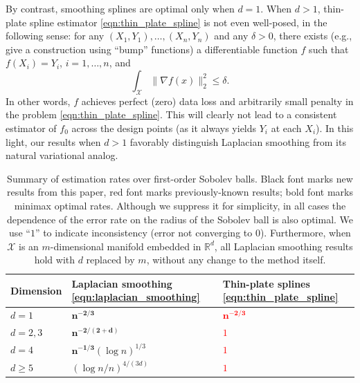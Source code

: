 \documentclass[twoside]{article}
\newcommand{\Reals}{\mathbb{R}}
\newcommand{\1}{\mathbf{1}}
\newcommand{\Rd}{\Reals^d}
\newcommand{\Xset}{\mathcal{X}}
\theoremstyle{definition}
\theoremstyle{remark}
\begin{document}
By contrast, smoothing splines are optimal only when $d=1$. When $d>1$, thin-plate spline estimator \eqref{eqn:thin_plate_spline} is not even well-posed, in the following sense: for any $(X_1,Y_1),\ldots,(X_n,Y_n)$ and any $\delta>0$, there exists (e.g., \citet{green93} give a construction using ``bump'' functions) a differentiable function $f$ such that $f(X_i) = Y_i$, $i=1,\ldots,n$, and
\begin{equation*}
\int_{\Xset} \|\nabla f(x)\|_2^2 \leq \delta.
\end{equation*}
In other words, $f$ achieves perfect (zero) data loss and arbitrarily small penalty in the problem \eqref{eqn:thin_plate_spline}. This will clearly not lead to a consistent estimator of $f_0$ across the design points (as it always yields $Y_i$ at each $X_i$). In this light, our results when $d>1$ favorably distinguish Laplacian smoothing from its natural variational analog.

\begin{table}
	\begin{center}
		\begin{tabular}{p{} | p{} p{} }
			Dimension & Laplacian smoothing \eqref{eqn:laplacian_smoothing} & Thin-plate splines \eqref{eqn:thin_plate_spline} \\
			\hline
			$d = 1$ & $\bm{n^{-2/3}}$ & \textcolor{red}{$\bm{n^{-2/3}}$} \\
			$d = 2,3$ & $\bm{n^{-2/(2 + d)}}$ & \textcolor{red}{$1$} \\
			$d = 4$ & $\bm{n^{-1/3}} (\log n)^{1/3}$ & \textcolor{red}{$1$} \\
			$d \geq 5$  & $(\log n/n)^{4/(3d)}$ &\textcolor{red}{$1$} \\
		\end{tabular}
	\end{center}
	\caption{Summary of estimation rates over first-order Sobolev balls. Black font marks new results from this paper, red font marks previously-known results; bold font marks minimax optimal rates. Although we suppress it for simplicity, in all cases the dependence of the error rate on the radius of the Sobolev ball is also optimal. We use ``$1$'' to indicate inconsistency (error not converging to 0). Furthermore, when $\Xset$ is an $m$-dimensional manifold embedded in $\Rd$, all Laplacian smoothing results hold with $d$ replaced by $m$, without any change to the method itself.}
	\label{tbl:estimation_rates}
\end{table}
\end{document}
